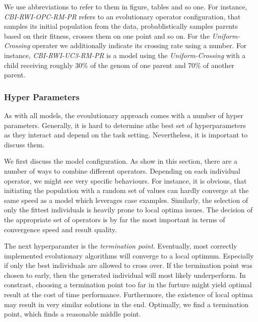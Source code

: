 \documentclass[./../../paper.tex]{subfiles}
\begin{document}
We use abbreviations to refer to them in figure, tables and so one. For instance, \emph{CBI-RWI-OPC-RM-PR} refers to an evolutionary operator configuration, that samples its initial population from the data, probablistically samples parents based on their fitness, crosses them on one point and so on. For the \emph{Uniform-Crossing} operater we additionally indicate its crossing rate using a number. For instance,  \emph{CBI-RWI-UC3-RM-PR} is a model using the \emph{Uniform-Crossing} with a child receiving roughly 30\% of the genom of one parent and 70\% of another parent.

\subsubsection{Hyper Parameters}
As with all models, the evoulutionary approach comes with a number of hyper parameters. Generally, it is hard to determine athe best set of hyperparameters as they interact and depend on the task setting. Nevertheless, it is important to discuss them. 

We first discuss the model configuration. As show in this section, there are a number of ways to combine different operators. Depending on each individual operator, we might see very specific behaviours. For instance, it is obvious, that initiating the population with a random set of values can hardly converge at the same speed as a model which leverages case examples. Similarly, the selection of only the fittest individuals is heavily prone to local optima issues. The decision of the appropriate set of operators is by far the most important in terms of convergence speed and result quality. 

The next hyperparamter is the \emph{termination point}. Eventually, most correctly implemented evolutionary algorithms will converge to a local optimum. Especially if only the best individuals are allowed to cross over. If the termination point was chosen to early, then the generated individual will most likely underperform. In constrast, choosing a termination point too far in the furture might yield optimal result at the cost of time performance. Furthermore, the existence of local optima may result in very similar solutions in the end. Optimally, we find a termination point, which finds a reasonable middle point.
\end{document}
